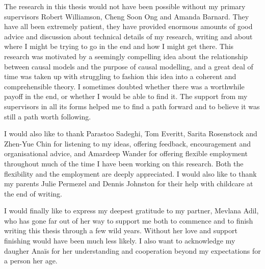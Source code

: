 \begin{acknowledgements}
\addchaptertocentry{\acknowledgementname} %
\vspace{0.4cm}
\begingroup
\normalsize
The research in this thesis would not have been possible without my primary supervisors Robert Williamson, Cheng Soon Ong and Amanda Barnard. They have all been extremely patient, they have provided enormous amounts of good advice and discussion about technical details of my research, writing and about where I might be trying to go in the end and how I might get there. This research was motivated by a seemingly compelling idea about the relationship between causal models and the purpose of causal modelling, and a great deal of time was taken up with struggling to fashion this idea into a coherent and comprehensible theory. I sometimes doubted whether there was a worthwhile payoff in the end, or whether I would be able to find it. The support from my supervisors in all its forms helped me to find a path forward and to believe it was still a path worth following.

I would also like to thank Parastoo Sadeghi, Tom Everitt, Sarita Rosenstock and Zhen-Yue Chin for listening to my ideas, offering feedback, encouragement and organisational advice, and Amardeep Wander for offering flexible employment throughout much of the time I have been working on this research. Both the flexibility and the employment are deeply appreciated. I would also like to thank my parents Julie Permezel and Dennis Johnston for their help with childcare at the end of writing.

I would finally like to express my deepest gratitude to my partner, Mevlana Adil, who has gone far out of her way to support me both to commence and to finish writing this thesis through a few wild years. Without her love and support finishing would have been much less likely. I also want to acknowledge my daugher Ana\"is for her understanding and cooperation beyond my expectations for a person her age.
\endgroup
\end{acknowledgements}


